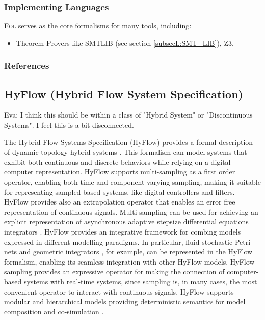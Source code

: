 \subsubsection{Implementing Languages}

\textsc{Fol} serves as the core formalisms for many tools, including:
\begin{itemize}
	\item Theorem Provers like SMT\textunderscore LIB (see section \ref{subsecL:SMT_LIB}), Z3, 
\end{itemize}


\subsubsection{References}



\subsection{HyFlow (Hybrid Flow System Specification)}%
\label{subsecF:HyFlow}

Eva: I think this should be within a class of "Hybrid System" or "Discontinuous Systems". I feel this is a bit disconnected.


The Hybrid Flow Systems Specification (HyFlow) provides a formal description of dynamic topology hybrid systems \cite{Barros:2003:DSM}. This formalism can model systems that exhibit both continuous and discrete behaviors while relying on a digital computer representation. HyFlow supports multi-sampling as a first order operator, enabling both time and component varying sampling, making it suitable for representing sampled-based systems, like digital controllers and filters. HyFlow provides also an extrapolation operator that enables an error free representation of continuous signals. Multi-sampling can be used for achieving an explicit representation of asynchronous adaptive stepsize differential equations integrators \cite{Barros-2018:Geometric}. HyFlow provides an integrative framework for combing models expressed in different modelling paradigms. In particular, fluid stochastic Petri nets \cite{Barros-2015:FSPN} and geometric integrators \cite{Barros-2018:Geometric}, for example, can be  represented in the HyFlow formalism, enabling its seamless integration with other HyFlow models. HyFlow sampling provides an expressive operator for making the connection of computer-based systems with real-time systems, since sampling is, in many cases, the most convenient operator to interact with continuous signals. HyFlow supports modular and hierarchical models providing deterministic semantics for model composition and co-simulation \cite{Barros:2008:SDS}.

